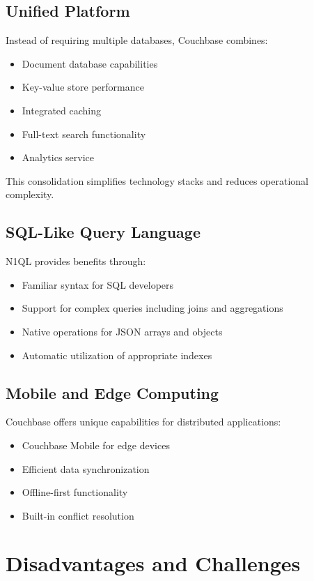 \subsection{Unified Platform}

Instead of requiring multiple databases, Couchbase combines:
\begin{itemize}
  \item Document database capabilities
  \item Key-value store performance
  \item Integrated caching
  \item Full-text search functionality
  \item Analytics service
\end{itemize}

This consolidation simplifies technology stacks and reduces operational complexity.

\subsection{SQL-Like Query Language}

N1QL provides benefits through:
\begin{itemize}
  \item Familiar syntax for SQL developers
  \item Support for complex queries including joins and aggregations
  \item Native operations for JSON arrays and objects
  \item Automatic utilization of appropriate indexes
\end{itemize}

\subsection{Mobile and Edge Computing}

Couchbase offers unique capabilities for distributed applications:
\begin{itemize}
  \item Couchbase Mobile for edge devices
  \item Efficient data synchronization
  \item Offline-first functionality
  \item Built-in conflict resolution
\end{itemize}

\section{Disadvantages and Challenges}

